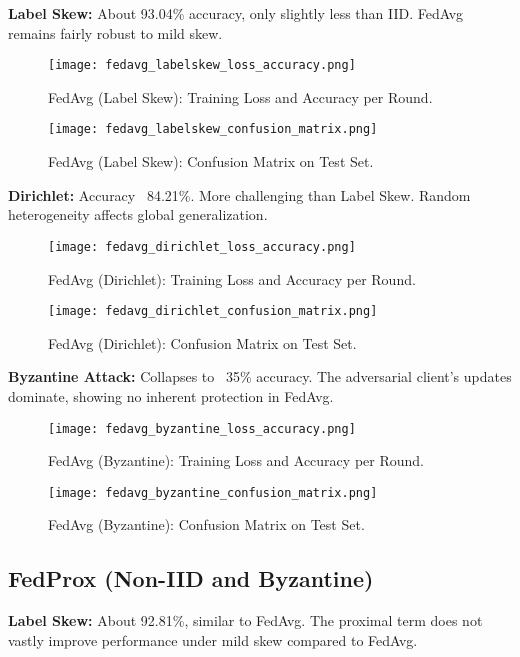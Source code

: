 \documentclass[12pt,a4paper]{report}
\begin{document}
\textbf{Label Skew:} About 93.04\% accuracy, only slightly less than IID. FedAvg remains fairly robust to mild skew.

\begin{figure}[H]
	\centering
	\texttt{[image: fedavg\_labelskew\_loss\_accuracy.png]}
	\caption{FedAvg (Label Skew): Training Loss and Accuracy per Round.}
\end{figure}

\begin{figure}[H]
	\centering
	\texttt{[image: fedavg\_labelskew\_confusion\_matrix.png]}
	\caption{FedAvg (Label Skew): Confusion Matrix on Test Set.}
\end{figure}

\textbf{Dirichlet:} Accuracy ~84.21\%. More challenging than Label Skew. Random heterogeneity affects global generalization.

\begin{figure}[H]
	\centering
	\texttt{[image: fedavg\_dirichlet\_loss\_accuracy.png]}
	\caption{FedAvg (Dirichlet): Training Loss and Accuracy per Round.}
\end{figure}

\begin{figure}[H]
	\centering
	\texttt{[image: fedavg\_dirichlet\_confusion\_matrix.png]}
	\caption{FedAvg (Dirichlet): Confusion Matrix on Test Set.}
\end{figure}

\textbf{Byzantine Attack:} Collapses to ~35\% accuracy. The adversarial client’s updates dominate, showing no inherent protection in FedAvg.

\begin{figure}[H]
	\centering
	\texttt{[image: fedavg\_byzantine\_loss\_accuracy.png]}
	\caption{FedAvg (Byzantine): Training Loss and Accuracy per Round.}
\end{figure}

\begin{figure}[H]
	\centering
	\texttt{[image: fedavg\_byzantine\_confusion\_matrix.png]}
	\caption{FedAvg (Byzantine): Confusion Matrix on Test Set.}
\end{figure}

\subsection{FedProx (Non-IID and Byzantine)}

\textbf{Label Skew:} About 92.81\%, similar to FedAvg. The proximal term does not vastly improve performance under mild skew compared to FedAvg.
\end{document}
